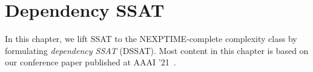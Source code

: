 \chapter{Dependency SSAT}
\label{chap:dependency-ssat}

In this chapter, we lift SSAT to the NEXPTIME-complete complexity class by formulating \textit{dependency SSAT} (DSSAT).
Most content in this chapter is based on our conference paper published at AAAI '21~\cite{LeeAAAI21DSSAT}.


